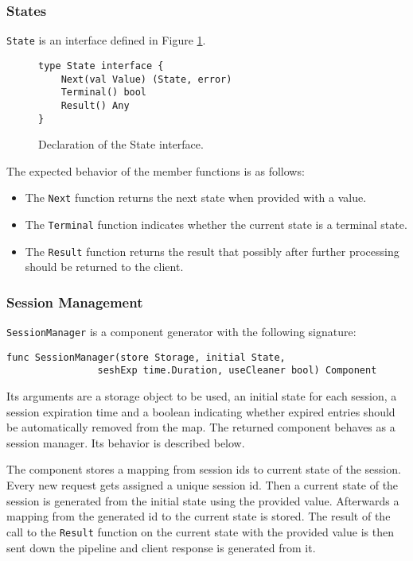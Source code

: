 \subsubsection{States}
\label{sec:state}
\texttt{State} is an interface defined in Figure \ref{fig:State}.
\begin{figure}[h]
\centering
\begin{lstlisting}
type State interface {
    Next(val Value) (State, error)
    Terminal() bool
    Result() Any
}
\end{lstlisting}
\caption[scale=1.0]{Declaration of the State interface.}
\label{fig:State}
\end{figure}
The expected behavior of the member functions is as follows:
\begin{itemize}
	\item The \texttt{Next} function returns the next state when provided 
          with a value.
	\item The \texttt{Terminal} function indicates whether the current 
          state is a terminal state.
	\item The \texttt{Result} function returns the result that possibly 
          after further processing should be returned to the client.
\end{itemize}

\subsubsection{Session Management}
\texttt{SessionManager} is a component generator with the following signature:
\begin{lstlisting}
func SessionManager(store Storage, initial State, 
                seshExp time.Duration, useCleaner bool) Component
\end{lstlisting}
Its arguments are a storage object to be used, an initial state for each session,
a session expiration time and a boolean indicating whether expired
entries should be automatically removed from the map.
The returned component behaves as a session manager. 
Its behavior is described below.

The component stores a mapping from session ids to current state of the session.
Every new request gets assigned a unique session id. Then a current state
of the session is generated from the initial state using the provided
value. Afterwards a mapping from the generated id to the current state
is stored. The result of the call to the \texttt{Result} function on the
current state with the provided value is then sent down the pipeline and
client response is generated from it.

